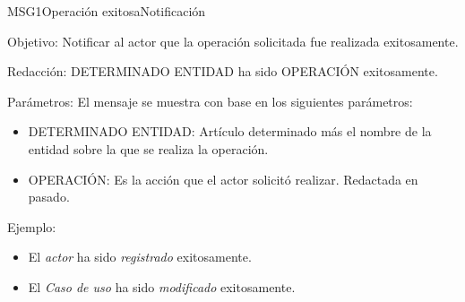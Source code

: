 \begin{mensaje}{MSG1}{Operación exitosa}{Notificación}
	\item [Objetivo:] Notificar al actor que la operación solicitada fue realizada exitosamente.
	\item[Redacción:] DETERMINADO ENTIDAD ha sido OPERACIÓN exitosamente.
	\item[Parámetros:] El mensaje se muestra con base en los siguientes parámetros:
		\begin{itemize}
 			\item DETERMINADO ENTIDAD: Artículo determinado más el nombre de la entidad sobre la que se realiza la operación.
 			\item OPERACIÓN: Es la acción que el actor solicitó realizar. Redactada en pasado.
		\end{itemize}
	\item[Ejemplo:] \begin{itemize}
		\item El {\em actor} ha sido {\em registrado} exitosamente.
		\item El {\em Caso de uso} ha sido {\em modificado} exitosamente.
	\end{itemize}
\end{mensaje}